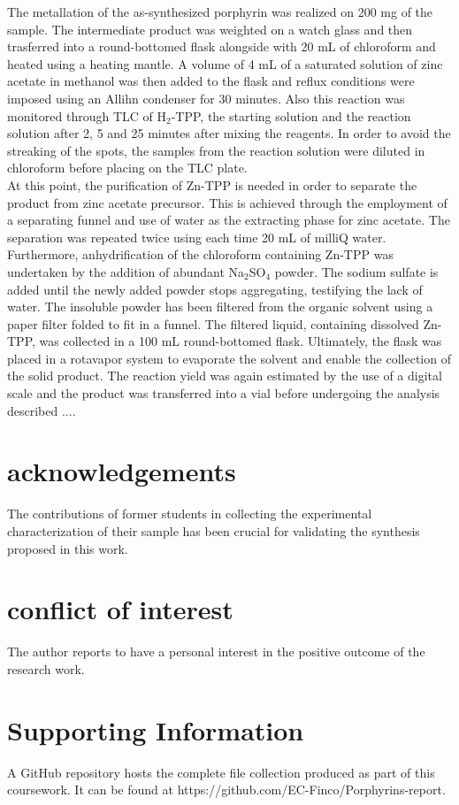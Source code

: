\documentclass[num-refs]{wiley-article}
\begin{document}
\break
The metallation of the as-synthesized porphyrin was realized on 200 mg of the sample.
The intermediate product was weighted on a watch glass and then trasferred into a round-bottomed flask alongside with 20 mL of chloroform and heated using a heating mantle.
A volume of 4 mL of a saturated solution of zinc acetate in methanol was then added to the flask and reflux conditions were imposed using an Allihn condenser for 30 minutes.
Also this reaction was monitored through TLC of H$_{2}$-TPP, the starting solution and the reaction solution after 2, 5 and 25 minutes after mixing the reagents.
In order to avoid the streaking of the spots, the samples from the reaction solution were diluted in chloroform before placing on the TLC plate.\\
\break
At this point, the purification of Zn-TPP is needed in order to separate the product from zinc acetate precursor.
This is achieved through the employment of a separating funnel and use of water as the extracting phase for zinc acetate.
The separation was repeated twice using each time 20 mL of milliQ water.
Furthermore, anhydrification of the chloroform containing Zn-TPP was undertaken by the addition of abundant Na$_{2}$SO$_{4}$ powder.
The sodium sulfate is added until the newly added powder stops aggregating, testifying the lack of water.
The insoluble powder has been filtered from the organic solvent using a paper filter folded to fit in a funnel.
The filtered liquid, containing dissolved Zn-TPP, was collected in a 100 mL round-bottomed flask.
Ultimately, the flask was placed in a rotavapor system to evaporate the solvent and enable the collection of the solid product.
The reaction yield was again estimated by the use of a digital scale and the product was transferred into a vial before undergoing the analysis described ....

\section*{acknowledgements}
The contributions of former students in collecting the experimental characterization of their sample has been crucial for validating the synthesis proposed in this work.
\section*{conflict of interest}
The author reports to have a personal interest in the positive outcome of the research work.
\section*{Supporting Information}
A GitHub repository hosts the complete file collection produced as part of this coursework.
It can be found at https://github.com/EC-Finco/Porphyrins-report.
\printendnotes


\end{document}
